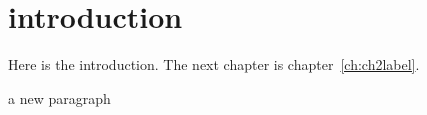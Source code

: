 \chapter{introduction}\label{ch:introduction}
Here is the introduction. The next chapter is chapter~\ref{ch:ch2label}.


a new paragraph